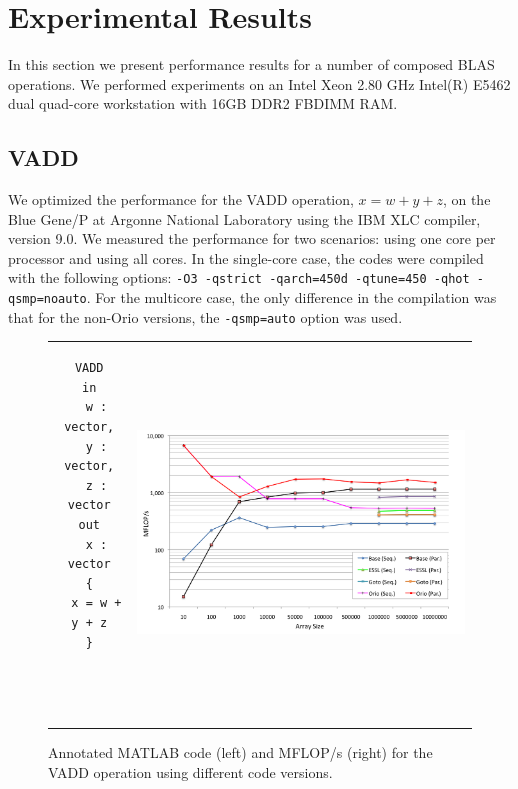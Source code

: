 \documentclass[11pt]{article}
\begin{document}
\section{Experimental Results}
\label{sec:experiments}

In this section we present performance results for a number of composed BLAS operations. We performed experiments on an Intel Xeon 2.80 GHz Intel(R) E5462 dual quad-core workstation with 16GB DDR2 FBDIMM RAM.


\subsection{VADD}

We optimized the performance for the VADD operation, $x = w + y + z$, on the Blue Gene/P at Argonne National Laboratory using the IBM XLC compiler, version 9.0. We measured the performance for two scenarios: using one core per processor and using all cores. In the single-core case, the codes were compiled with the following options: \texttt{-O3 -qstrict -qarch=450d -qtune=450 -qhot -qsmp=noauto}. For the multicore case, the only difference in the compilation was that for the non-Orio versions, the \texttt{-qsmp=auto} option was used.

\begin{figure}[htp]
\centering
\begin{tabular}{cc}
\begin{minipage}[b]{.25\textwidth}
\footnotesize
\begin{verbatim}
VADD
in
  w : vector,
  y : vector,
  z : vector
out
  x : vector
{
  x = w + y + z
}




\end{verbatim}
\end{minipage}
&
\begin{minipage}[b]{.6\textwidth}
\includegraphics[width=\textwidth]{figures/vadd_bgp.png}
\end{minipage}\\
\end{tabular}
\caption{Annotated MATLAB code (left) and MFLOP/s (right) for the VADD operation using different code versions.}
\label{fig:vadd}
\end{figure}
\end{document}
